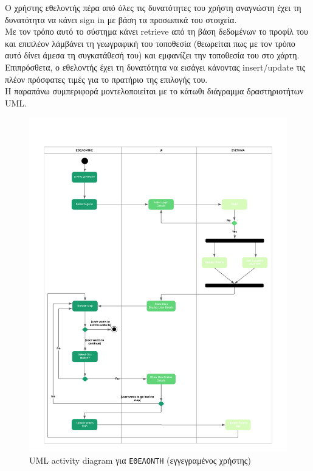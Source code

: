 Ο χρήστης εθελοντής πέρα από όλες τις δυνατότητες του χρήστη αναγνώστη έχει τη δυνατότητα να κάνει sign in με βάση τα προσωπικά του στοιχεία. \\
Με τον τρόπο αυτό το σύστημα κάνει retrieve από τη βάση δεδομένων το προφίλ του και επιπλέον λάμβάνει τη γεωγραφική του τοποθεσία (θεωρείται πως με τον τρόπο αυτό δίνει άμεσα τη συγκατάθεσή του) και εμφανίζει την τοποθεσία του στο χάρτη.\\
Επιπρόσθετα, ο εθελοντής έχει τη δυνατότητα να εισάγει κάνοντας insert/update τις πλέον πρόσφατες τιμές για το πρατήριο της επιλογής του.\\
Η παραπάνω συμπεριφορά μοντελοποιείται με το κάτωθι διάγραμμα δραστηριοτήτων UML.
\begin{figure}
	\centering\includegraphics[width = \linewidth]{uml/volunteer.png}
	\caption{UML activity diagram για \texttt{ΕΘΕΛΟΝΤΗ} (εγγεγραμένος χρήστης)}
\end{figure}